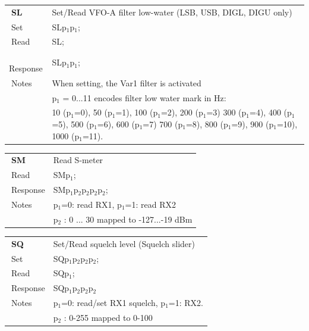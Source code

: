 \documentclass[12pt]{book}
\begin{document}
\begin{center}
\begin{tabular}{|p{2cm}|p{11cm}|}
\toprule
$\phantom{\Big|}$\textbf{\large SL} & Set/Read VFO-A filter low-water (LSB, USB, DIGL, DIGU only) \\\cline{1-2}
$\phantom{\Big|}${\large Set} & {SLp$_1$p$_1$;} \\\hline
$\phantom{\Big|}${\large Read} & {SL;} \\\hline
$\phantom{\Big|}${\large Response} & {SLp$_1$p$_1$;} \\\hline
$\phantom{\Big|}${\large Notes} & \multicolumn{1}{|p{11cm}|}{When setting, the Var1 filter is activated} \\
 & \multicolumn{1}{|p{11cm}|}{p$_1$ = 0...11 encodes filter low water mark in Hz:} \\
 & \multicolumn{1}{|p{11cm}|}{10 (p$_1$=0), 50 (p$_1$=1), 100 (p$_1$=2), 200 (p$_1$=3) 300 (p$_1$=4), 400 (p$_1$=5), 500 (p$_1$=6), 600 (p$_1$=7) 700 (p$_1$=8), 800 (p$_1$=9), 900 (p$_1$=10), 1000 (p$_1$=11).} \\
\bottomrule
\end{tabular}
\end{center}

\begin{center}
\begin{tabular}{|p{2cm}|p{11cm}|}
\toprule
$\phantom{\Big|}$\textbf{\large SM} & Read S-meter \\\cline{1-2}
$\phantom{\Big|}${\large Read} & {SMp$_1$;} \\\hline
$\phantom{\Big|}${\large Response} & {SMp$_1$p$_2$p$_2$p$_2$p$_2$;} \\\hline
$\phantom{\Big|}${\large Notes} & \multicolumn{1}{|p{11cm}|}{p$_1$=0: read RX1, p$_1$=1: read RX2} \\
 & \multicolumn{1}{|p{11cm}|}{p$_2$ : 0 ... 30 mapped to -127...-19 dBm} \\
\bottomrule
\end{tabular}
\end{center}

\begin{center}
\begin{tabular}{|p{2cm}|p{11cm}|}
\toprule
$\phantom{\Big|}$\textbf{\large SQ} & Set/Read squelch level (Squelch slider) \\\cline{1-2}
$\phantom{\Big|}${\large Set} & {SQp$_1$p$_2$p$_2$p$_2$;} \\\hline
$\phantom{\Big|}${\large Read} & {SQp$_1$;} \\\hline
$\phantom{\Big|}${\large Response} & {SQp$_1$p$_2$p$_2$p$_2$} \\\hline
$\phantom{\Big|}${\large Notes} & \multicolumn{1}{|p{11cm}|}{p$_1$=0: read/set RX1 squelch, p$_1$=1: RX2.} \\
 & \multicolumn{1}{|p{11cm}|}{p$_2$ : 0-255 mapped to 0-100} \\
\bottomrule
\end{tabular}
\end{center}
\end{document}
